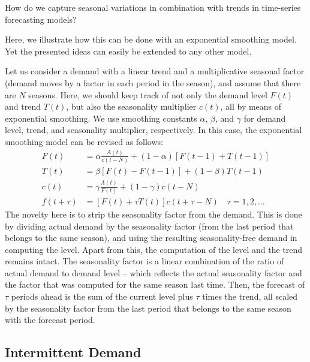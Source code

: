 \begin{question}
How do we capture seasonal variations in combination with trends in time-series forecasting models?

  \begin{solution}   
   Here, we illustrate how this can be done with an exponential smoothing model. Yet the presented ideas can easily be extended to any other model. 
 
Let us consider a demand with a linear trend and a multiplicative seasonal factor (demand moves by a factor in each period in the season), and assume that there are $N$ seasons. Here, we should keep track of not only the demand level $F(t)$ and trend $T(t)$, but also the seasonality multiplier $c(t)$, all by means of exponential smoothing. We use smoothing constants $\alpha$, $\beta$, and $\gamma$ for demand level, trend, and seasonality multiplier, respectively. In this case, the exponential smoothing model can be revised as follows:
\begin{align*}
F(t) & = \alpha  \frac{A(t)}{c(t-N)}+ (1-\alpha) [F(t-1) + T(t-1)] \\
T(t) & = \beta [F(t)-F(t-1)] + (1-\beta) T(t-1) \\
c(t) & = \gamma \frac{A(t)}{F(t)} + (1-\gamma) c(t-N) \\
f(t+\tau) & = [F(t) + \tau T(t)] c(t+\tau-N) \quad \tau = 1,2,\ldots
\end{align*}
The novelty here is to strip the seasonality factor from the demand. This is done by dividing actual demand by the seasonality factor (from the last period that belongs to the same season), and using the resulting seasonality-free demand in computing the level. Apart from this, the computation of the level and the trend remains intact. The seasonality factor is a linear combination of the ratio of actual demand to demand level -- which reflects the actual seasonality factor and the factor that was computed for the same season last time. Then, the forecast of $\tau$ periods ahead is the sum of the current level plus $\tau$ times the trend, all scaled by the seasonality factor from the last period that belongs to the same season with the forecast period. 
  \end{solution}
\end{question}

\subsection{Intermittent Demand}

